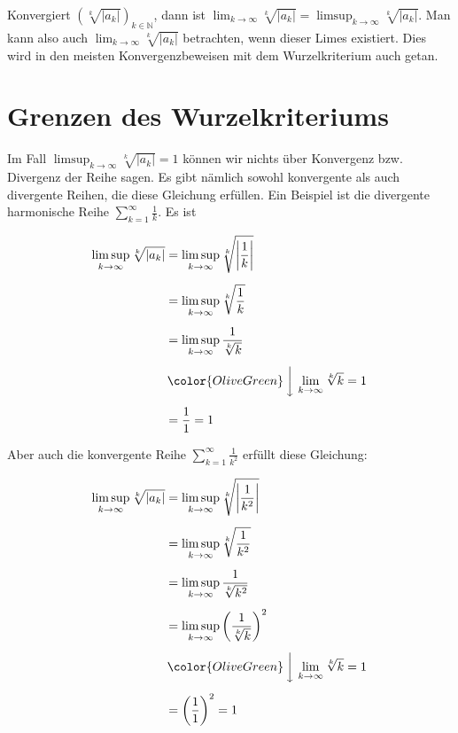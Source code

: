 \documentclass[fontsize=9pt,
               parskip=half-,
               DIV=14,
               listof=chapterentry,
               tocflat]{scrbook}
\begin{document}
\begin{hint*}
Konvergiert $\left({\sqrt[{k}]{|a_{k}|}}\right)_{k\in \mathbb {N} }$, dann ist $\lim _{k\to \infty }{\sqrt[{k}]{|a_{k}|}}=\limsup _{k\to \infty }{\sqrt[{k}]{|a_{k}|}}$. Man kann also auch $\lim _{k\to \infty }{\sqrt[{k}]{|a_{k}|}}$ betrachten, wenn dieser Limes existiert. Dies wird in den meisten Konvergenzbeweisen mit dem Wurzelkriterium auch getan.

\end{hint*}

\section{Grenzen des Wurzelkriteriums}

Im Fall $\limsup _{k\to \infty }{\sqrt[{k}]{|a_{k}|}}=1$ können wir nichts über Konvergenz bzw. Divergenz der Reihe sagen. Es gibt nämlich sowohl konvergente als auch divergente Reihen, die diese Gleichung erfüllen. Ein Beispiel ist die divergente harmonische Reihe $\sum _{k=1}^{\infty }{\frac {1}{k}}$. Es ist

\begin{align*}
\limsup _{k\to \infty }{\sqrt[{k}]{|a_{k}|}}&=\limsup _{k\to \infty }{\sqrt[{k}]{\left|{\frac {1}{k}}\right|}}\\[0.5em]&=\limsup _{k\to \infty }{\sqrt[{k}]{\frac {1}{k}}}\\[0.5em]&=\limsup _{k\to \infty }{\frac {1}{\sqrt[{k}]{k}}}\\[0.5em]&\,{\color {OliveGreen}\left\downarrow \ \lim _{k\to \infty }{\sqrt[{k}]{k}}=1\right.}\\[0.5em]&={\frac {1}{1}}=1
\end{align*}

Aber auch die konvergente Reihe $\sum _{k=1}^{\infty }{\frac {1}{k^{2}}}$ erfüllt diese Gleichung:

\begin{align*}
\limsup _{k\to \infty }{\sqrt[{k}]{|a_{k}|}}&=\limsup _{k\to \infty }{\sqrt[{k}]{\left|{\frac {1}{k^{2}}}\right|}}\\[0.5em]&=\limsup _{k\to \infty }{\sqrt[{k}]{\frac {1}{k^{2}}}}\\[0.5em]&=\limsup _{k\to \infty }{\frac {1}{\sqrt[{k}]{k^{2}}}}\\[0.5em]&=\limsup _{k\to \infty }\left({\frac {1}{\sqrt[{k}]{k}}}\right)^{2}\\[0.5em]&\,{\color {OliveGreen}\left\downarrow \ \lim _{k\to \infty }{\sqrt[{k}]{k}}=1\right.}\\[0.5em]&=\left({\frac {1}{1}}\right)^{2}=1
\end{align*}
\end{document}
